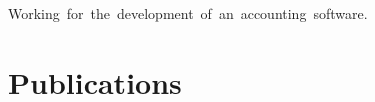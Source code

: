 \documentclass[%
               doublesided,
               paper=a4,
               fontsize=11pt
              ]{my-resume}
\begin{document}
{    
    \hbox{\small Working for the development of an accounting software.}
    \divider
    
    


    
    \section[\faBook]{Publications}
    \nocite{*}
    \printbibliography[heading=none]
    
    
}
\makebody
\clearpage
\end{document}
